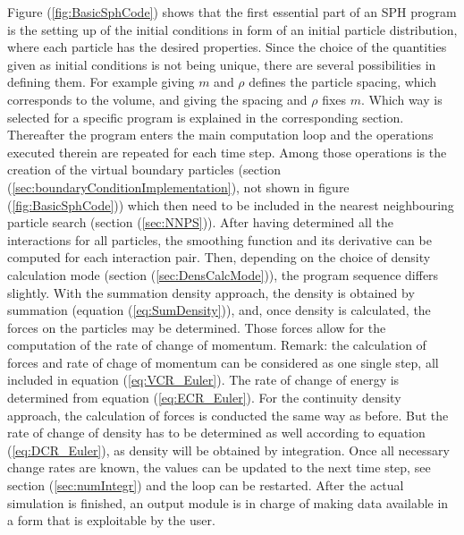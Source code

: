 \documentclass{report}
\begin{document}
Figure (\ref{fig:BasicSphCode}) shows that the first essential part of an SPH program is the setting up of the initial conditions in form of an initial particle distribution, where each particle has the desired properties.
Since the choice of the quantities given as 
initial conditions is not being unique, there are several possibilities in defining 
them. For example giving $m$ and $\rho$ defines the particle spacing, which corresponds to the volume, and giving the spacing and $\rho$ fixes $m$. Which way is selected for a specific program is explained in the corresponding section. 
Thereafter the program enters the main computation loop and the operations executed 
therein are repeated for each time step. Among those operations is the creation of the 
virtual boundary particles (section (\ref{sec:boundaryConditionImplementation}), not shown in figure (\ref{fig:BasicSphCode})) which then 
need to be included in the nearest neighbouring particle search (section (\ref{sec:NNPS})). 
After having determined all the interactions for all particles, the smoothing function 
and its derivative can be computed for each interaction pair. Then, depending on the 
choice of density calculation mode (section (\ref{sec:DensCalcMode})), the program sequence differs slightly. 
With the summation density approach, the density is obtained by summation 
(equation (\ref{eq:SumDensity})), and, once density is calculated, the forces on the 
particles may be determined. Those forces allow for the computation of the rate
of change of momentum. Remark: the calculation of forces and rate of chage of  momentum 
can be considered as one single step, all included in equation (\ref{eq:VCR_Euler}). The rate of change of energy is determined from equation (\ref{eq:ECR_Euler}).
For the continuity density approach, the calculation of forces is conducted the same way as before. But the rate of change of density 
has to be determined as well according to equation (\ref{eq:DCR_Euler}), as density will be obtained by integration. 
Once all necessary change rates are known, the values can be updated to the next time step, see section (\ref{sec:numIntegr}) and the loop can be restarted. After the actual simulation is finished, an output module is in charge of making data available in a form that is exploitable by the user.
\end{document}

